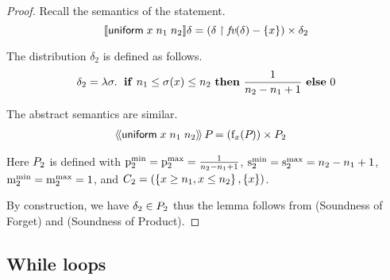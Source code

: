 \begin{proof} Recall the semantics of the statement.
$$ [\![{\mathsf{uniform}\;{x}\;{n_1}\;n_2}]\!]{\delta} = \left( \delta \upharpoonright \textit{fv}(\delta)
- \left\{ x \right\} \right) \times \delta_2 $$

The distribution $ \delta_2 $ is defined as follows.
$$ \delta_2 = \lambda \sigma . \; \text{ \textbf{if} } n_1 \leq \sigma(x) \leq
n_2 \text{ \textbf{then} } \frac{1}{n_2 - n_1 + 1} \text{ \textbf{else} } 0 $$

The abstract semantics are similar.
\begin{align*}
\langle\!\langle{\mathsf{uniform}\;{x}\;{n_1}\;n_2}\rangle\!\rangle\,{P_{}} &
= \left( \mathrm{f}_{x}(P_{}) \right) \times P_{2}
\end{align*}

Here $ P_{2} $ is defined with $ \mathrm{p}^\mathrm{min}_{2} = \mathrm{p}^\mathrm{max}_{2} = \frac{1}{n_2 -
n_1 + 1} $, $ \mathrm{s}^\mathrm{min}_{2} = \mathrm{s}^\mathrm{max}_{2} = n_2 - n_1 + 1 $, $ \mathrm{m}^\mathrm{min}_{2}
= \mathrm{m}^\mathrm{max}_{2} = 1 $, and $ C_2 = (\left\{ x \geq n_1, x \leq
n_2 \right\}, \left\{ x \right\}) $.

By construction, we have $ \delta_2 \in P_{2} $
thus the lemma follows from  (Soundness of
Forget) and  (Soundness of Product).
\end{proof}

\subsection{While loops}


